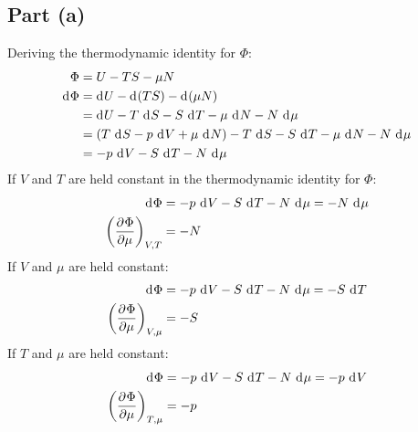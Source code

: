 \documentclass{article}
\begin{document}
\subsection*{Part (a)}
Deriving the thermodynamic identity for $\Phi$:
\begin{equation}
    \begin{split}
        \Phi & = U - TS - \mu N \\
        \diff{\Phi} & = \diff{U} - \diff{(TS)} - \diff{(\mu N)} \\
        & = \diff{U} - T \, \diff{S} - S \, \diff{T} - \mu \, \diff{N} - N \, \diff{\mu} \\
        & = (T \, \diff{S} - p \, \diff{V} + \mu \, \diff{N}) - T \, \diff{S} - S \, \diff{T} - \mu \, \diff{N} - N \, \diff{\mu} \\
        & = - p \, \diff{V} - S \, \diff{T} - N \, \diff{\mu} \\
    \end{split}
\end{equation}
If $V$ and $T$ are held constant in the thermodynamic identity for $\Phi$:
\begin{equation}
    \begin{split}
        \diff{\Phi} & = - p \, \diff{V} - S \, \diff{T} - N \, \diff{\mu} = - N \, \diff{\mu} \\
        {\left(\pderiv{\Phi}{\mu}\right)}_{V,T} & = -N
    \end{split}
\end{equation}
If $V$ and $\mu$ are held constant:
\begin{equation}
    \begin{split}
        \diff{\Phi} & = - p \, \diff{V} - S \, \diff{T} - N \, \diff{\mu} = - S \, \diff{T} \\
        {\left(\pderiv{\Phi}{\mu}\right)}_{V,\mu} & = -S
    \end{split}
\end{equation}
If $T$ and $\mu$ are held constant:
\begin{equation}
    \begin{split}
        \diff{\Phi} & = - p \, \diff{V} - S \, \diff{T} - N \, \diff{\mu} = - p \, \diff{V} \\
        {\left(\pderiv{\Phi}{\mu}\right)}_{T,\mu} & = -p
    \end{split}
\end{equation}
\end{document}
